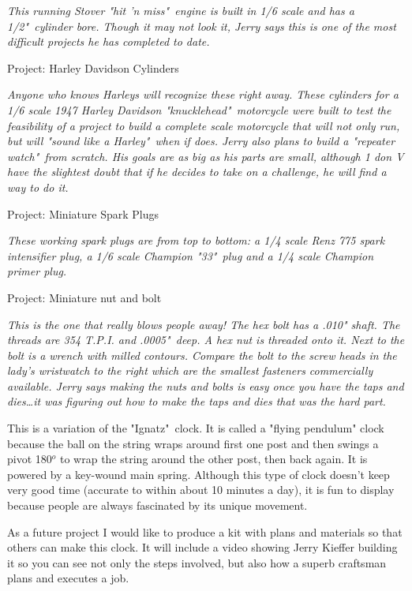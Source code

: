 \textit{This running Stover "hit 'n miss"\ engine is built in 1/6 scale and has
a 1/2"\ cylinder bore. Though it may not look it, Jerry says this is one of the
most difficult projects he has completed to date.}
\bigskip

Project: Harley Davidson Cylinders
\bigskip

\textit{Anyone who knows Harleys will recognize these right away. These
cylinders for a 1/6 scale 1947 Harley Davidson "knucklehead"\ motorcycle were
built to test the feasibility of a project to build a complete scale motorcycle
that will not only run, but will "sound like a Harley"\ when if does. Jerry also
plans to build a "repeater watch"\ from scratch. His goals are as big as his
parts are small, although 1 don V have the slightest doubt that if he decides to
take on a challenge, he will find a way to do it.}
\bigskip

Project: Miniature Spark Plugs
\bigskip

\textit{These working spark plugs are from top to bottom: a 1/4 scale Renz 775
spark intensifier plug, a 1/6 scale Champion "33"\ plug and a 1/4 scale Champion
primer plug.}
\bigskip

Project: Miniature nut and bolt
\bigskip

\textit{This is the one that really blows people away! The hex bolt has a .010"
shaft. The threads are 354 T.P.I. and .0005"\ deep. A hex nut is threaded onto
it. Next to the bolt is a wrench with milled contours. Compare the bolt to the
screw heads in the lady's wristwatch to the right which are the smallest
fasteners commercially available. Jerry says making the nuts and bolts is easy
once you have the taps and dies\ldots it was figuring out how to make the taps
and dies that was the hard part.}
\bigskip


This is a variation of the "Ignatz"\ clock. It is called a "flying pendulum"
clock because the ball on the string wraps around first one post and then swings
a pivot 180$^o$ to wrap the string around the other post, then back again. It is
powered by a key-wound main spring. Although this type of clock doesn't keep
very good time (accurate to within about 10 minutes a day), it is fun to display
because people are always fascinated by its unique movement.

As a future project I would like to produce a kit with plans and materials so
that others can make this clock. It will include a video showing Jerry Kieffer
building it so you can see not only the steps involved, but also how a superb
craftsman plans and executes a job.

